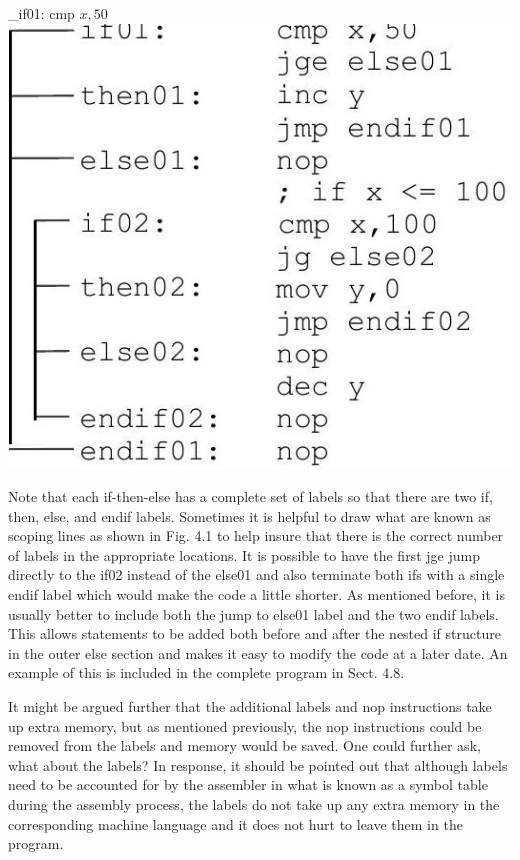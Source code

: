\documentclass[10pt]{article}
\begin{document}
\_if01: cmp $x, 50$\\
\includegraphics[max width=\textwidth, center]{2025_03_24_ebe50cc223a6fbc49eecg-071}

Note that each if-then-else has a complete set of labels so that there are two if, then, else, and endif labels. Sometimes it is helpful to draw what are known as scoping lines as shown in Fig. 4.1 to help insure that there is the correct number of labels in the appropriate locations. It is possible to have the first jge jump directly to the if02 instead of the else01 and also terminate both ifs with a single endif label which would make the code a little shorter. As mentioned before, it is usually better to include both the jump to else01 label and the two endif labels. This allows statements to be added both before and after the nested if structure in the outer else section and makes it easy to modify the code at a later date. An example of this is included in the complete program in Sect. 4.8.

It might be argued further that the additional labels and nop instructions take up extra memory, but as mentioned previously, the nop instructions could be removed from the labels and memory would be saved. One could further ask, what about the labels? In response, it should be pointed out that although labels need to be accounted for by the assembler in what is known as a symbol table during the assembly process, the labels do not take up any extra memory in the corresponding machine language and it does not hurt to leave them in the program.
\end{document}
